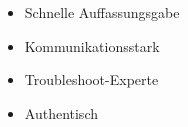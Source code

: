 %
%
%

\twocolumnsection
{
\begin{skills}
\end{skills}}
{
\vspace{1em}
\begin{itemize}
 \item Schnelle Auffassungsgabe   
 \item Kommunikationsstark
 \item Troubleshoot-Experte
 \item Au­then­tisch
\end{itemize}
}
